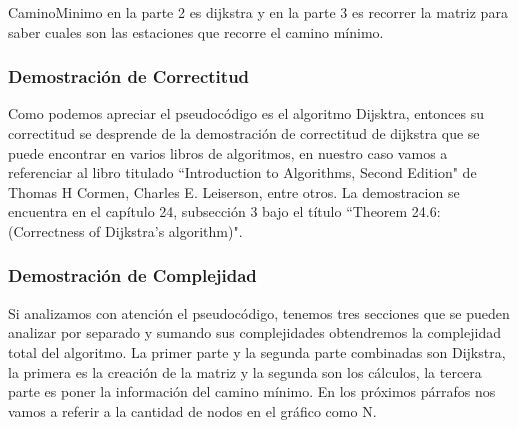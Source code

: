 \documentclass[spanish,12pt]{article}
\begin{document}
	CaminoMinimo en la parte 2 es dijkstra y en la parte 3 es recorrer la matriz para saber cuales son las estaciones que recorre el camino mínimo.





\newpage

\subsubsection{Demostración de Correctitud}
Como podemos apreciar el pseudocódigo es el algoritmo Dijsktra, entonces su correctitud se desprende de la demostración de correctitud de dijkstra que se puede encontrar en varios libros de algoritmos, en nuestro caso vamos a referenciar al libro titulado ``Introduction to Algorithms, Second Edition"  de Thomas H Cormen, Charles E. Leiserson, entre otros. La demostracion se encuentra en el capítulo 24, subsección 3 bajo el título ``Theorem 24.6: (Correctness of Dijkstra's algorithm)".

\subsubsection{Demostración de Complejidad}

Si analizamos con atención el pseudocódigo, tenemos tres secciones que se pueden analizar por separado y sumando sus complejidades obtendremos la complejidad total del algoritmo. La primer parte y la segunda parte combinadas son Dijkstra, la primera es la creación de la matriz y la segunda son los cálculos, la tercera parte es poner la información del camino mínimo. En los próximos párrafos nos vamos a referir a la cantidad de nodos en el gráfico como N.
\end{document}
